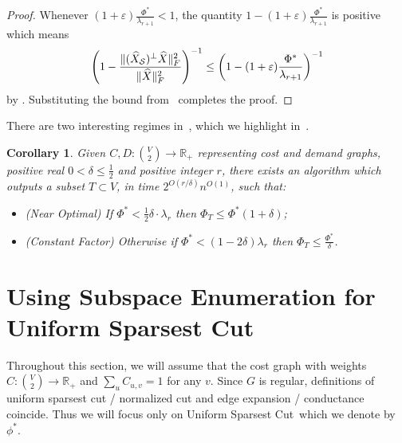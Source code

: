 \documentclass{article}
\let\eps=\varepsilon
\newtheorem{corollary}{Corollary}[section]
\newcommand{\R}{\mathbb{R}}
\newcommand{\usc}{\textsc{\sf Uniform Sparsest Cut}}
\newcounter{alg-count}
\renewcommand{\usc}{{\sc Uniform Sparsest Cut}}
\newcommand{\vnote}[1]{}
\newcommand{\aknote}[1]{}
\newcommand{\sde}{{\mathcal{S}}}
\begin{document}
\begin{proof} Whenever $(1+\eps) \frac{\Phi^\ast}{\lambda_{r+1}} < 1$,
  the quantity $1 - (1+\eps) \frac{\Phi^\ast}{\lambda_{r+1}}$ is
  positive which means
\[\left(1 - \frac{\|{(\widehat{\xmat}_{\sde})^{\perp}}\widehat{\xmat}
    \|^2_F} {\|\widehat{\xmat}\|^2_F}\right)^{-1} \le \left(1 -
  (1+\eps) \frac{\Phi^\ast}{\lambda_{r+1}} \right)^{-1}
\] by . Substituting the bound
from~ completes the proof.
\end{proof}
There are two interesting regimes in~, which we
highlight in~.
\begin{corollary}
\label{cor:final-bnd-regimes}
Given $C, D: \binom{V}{2}\to \R_+$ representing cost and demand
graphs, positive real $0<\delta \le \frac{1}{2}$ and positive integer
$r$, there exists an algorithm which outputs a subset $T\subset V$, in
time $2^{O(r/\delta)} n^{O(1)}$, such that:
\begin{itemize}
\item (Near Optimal) If $\Phi^\ast < \frac{1}{2} \delta \cdot
  \lambda_{r}$ then $\Phi_T \le \Phi^\ast (1+\delta)$;
\item (Constant Factor) Otherwise if $\Phi^\ast < (1-2 \delta)
  \lambda_{r}$ then $\Phi_T \le \frac{\Phi^\ast}{\delta}$.
\end{itemize}
\end{corollary}
\section{Using Subspace Enumeration for \usc}
\label{apx:rse}
\vnote{Should we acknowledge the reviewer here again?} \aknote{Done.}
Throughout this section, we will assume that the cost graph with
weights $C:\binom{V}{2}\to \R_+$ and $\sum_u C_{u,v} = 1$ for any
$v$. Since $G$ is regular, definitions of uniform sparsest cut / normalized
cut and edge expansion / conductance coincide. Thus we will focus only
on \usc\ which we denote by $\phi^\ast$.
\end{document}
